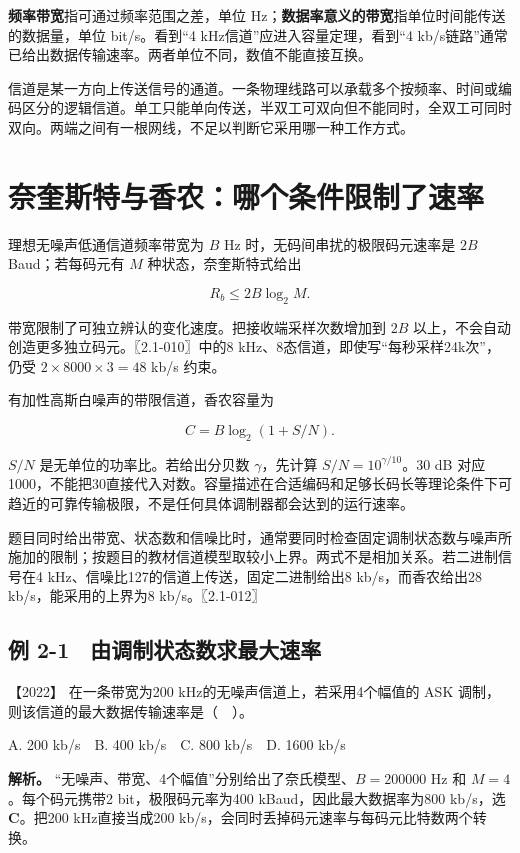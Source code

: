\textbf{频率带宽}指可通过频率范围之差，单位 Hz；\textbf{数据率意义的带宽}指单位时间能传送的数据量，单位 bit/s。看到``4 kHz信道''应进入容量定理，看到``4 kb/s链路''通常已给出数据传输速率。两者单位不同，数值不能直接互换。

信道是某一方向上传送信号的通道。一条物理线路可以承载多个按频率、时间或编码区分的逻辑信道。单工只能单向传送，半双工可双向但不能同时，全双工可同时双向。两端之间有一根网线，不足以判断它采用哪一种工作方式。

\section{奈奎斯特与香农：哪个条件限制了速率}\label{cn-02-02}

理想无噪声低通信道频率带宽为 \(B\) Hz 时，无码间串扰的极限码元速率是 \(2B\) Baud；若每码元有 \(M\) 种状态，奈奎斯特式给出

\[R_b\le 2B\log_2M.\]

带宽限制了可独立辨认的变化速度。把接收端采样次数增加到 \(2B\) 以上，不会自动创造更多独立码元。〖2.1-010〗中的8 kHz、8态信道，即使写``每秒采样24k次''，仍受 \(2\times8000\times3=48\) kb/s 约束。

有加性高斯白噪声的带限信道，香农容量为

\[C=B\log_2(1+S/N).\]

\(S/N\) 是无单位的功率比。若给出分贝数 \(\gamma\)，先计算 \(S/N=10^{\gamma/10}\)。30 dB 对应1000，不能把30直接代入对数。容量描述在合适编码和足够长码长等理论条件下可趋近的可靠传输极限，不是任何具体调制器都会达到的运行速率。

题目同时给出带宽、状态数和信噪比时，通常要同时检查固定调制状态数与噪声所施加的限制；按题目的教材信道模型取较小上界。两式不是相加关系。若二进制信号在4 kHz、信噪比127的信道上传送，固定二进制给出8 kb/s，而香农给出28 kb/s，能采用的上界为8 kb/s。〖2.1-012〗

\subsection{例 2-1　由调制状态数求最大速率}\label{cn-ex2-1}

\noindent{}【2022】 在一条带宽为200 kHz的无噪声信道上，若采用4个幅值的 ASK 调制，则该信道的最大数据传输速率是（　）。

A. 200 kb/s　B. 400 kb/s　C. 800 kb/s　D. 1600 kb/s


\textbf{解析。} ``无噪声、带宽、4个幅值''分别给出了奈氏模型、\(B=200000\) Hz 和 \(M=4\)。每个码元携带2 bit，极限码元率为400 kBaud，因此最大数据率为800 kb/s，选 \textbf{C}。把200 kHz直接当成200 kb/s，会同时丢掉码元速率与每码元比特数两个转换。


